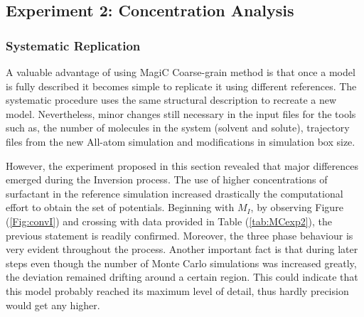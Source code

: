 \documentclass[10pt,a4paper,twoside]{article}
\begin{document}
\subsection{Experiment 2: Concentration Analysis}
\label{subsec:resexp2}

\subsubsection{Systematic Replication}

A valuable advantage of using MagiC Coarse-grain method is that once a model is fully described  it becomes simple to replicate it using different references. The systematic procedure uses the same structural description to recreate a new model. Nevertheless, minor changes still necessary in the input files for the tools such as, the number of molecules in the system (solvent and solute), trajectory files from the new All-atom simulation and modifications in simulation box size. 

However, the experiment proposed in this section revealed that major differences emerged during the Inversion process. The use of higher concentrations of surfactant in the reference simulation increased drastically the computational effort to obtain the set of potentials. Beginning with $M_{I}$, by observing Figure (\ref{Fig:convI}) and crossing with data provided in Table (\ref{tab:MCexp2}), the previous statement is readily confirmed. Moreover, the three phase behaviour is very evident throughout the process. Another important fact is that during later steps even though the number of Monte Carlo simulations was increased greatly, the deviation remained drifting around a certain region. This could indicate that this model probably reached its maximum level of detail, thus hardly precision would get any higher.
\end{document}
